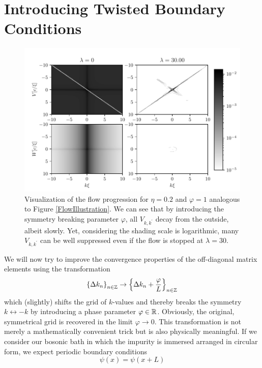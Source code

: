 \section{Introducing Twisted Boundary Conditions}
\begin{figure}[H]
    \centering
    \includegraphics[width=\textwidth]{figures/plots/PDF/FlowIllustrationPhi.pdf}
    \caption[Flow Visualization for $\eta=0.2$ and $\varphi = 1$]{Visualization of the flow progression for $\eta=0.2$ and $\varphi = 1$ analogous to Figure \ref{FlowIllustration}. We can see that by introducing the symmetry breaking parameter $\varphi$, all $V_{k,k^\prime}$ decay from the outside, albeit slowly. Yet, considering the shading scale is logarithmic, many $V_{k,k^\prime}$ can be well suppressed even if the flow is stopped at $\lambda=30$.}
    \label{FlowIllustrationPhi}
\end{figure}
We will now try to improve the convergence properties of the off-diagonal matrix elements using the transformation
\begin{equation} \label{twisted_trafo}
\left\{\Delta k_n\right\}_{n\in\mathbb{Z}}\rightarrow \left\{\Delta k_n+\frac{\varphi}{L}\right\}_{n\in\mathbb{Z}}
\end{equation}
 which (slightly) shifts the grid of $k$-values and thereby breaks the symmetry $k\leftrightarrow -k$ by introducing a phase parameter $\varphi\in\mathbb{R}$. Obviously, the original, symmetrical grid is recovered in the limit $\varphi\rightarrow 0$. 
This transformation is not merely a mathematically convenient trick but is also physically meaningful. If we consider our bosonic bath in which the impurity is immersed arranged in circular form, we expect periodic boundary conditions
\begin{equation}
\psi(x)=\psi(x+L)
\end{equation}
